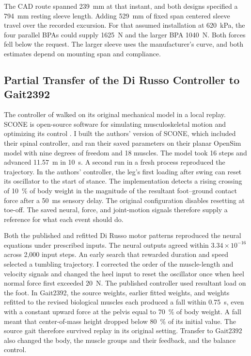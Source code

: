 The CAD route spanned \qty{239}{\milli\meter} at that instant, and both designs specified a \qty{794}{\milli\meter} resting sleeve length. Adding \qty{529}{\milli\meter} of fixed span centered sleeve travel over the recorded excursion. For that assumed installation at \qty{620}{\kPa}, the four parallel BPAs could supply \qty{1625}{\newton} and the larger BPA \qty{1040}{\newton}. Both forces fell below the request. The larger sleeve uses the manufacturer's curve, and both estimates depend on mounting span and compliance.

\subsection{Partial Transfer of the Di Russo Controller to Gait2392}\label{sec:app_dirusso_attempt}

The controller of \citet{dirusso_investigating_2023} walked on its original mechanical model in a local replay. SCONE is open-source software for simulating musculoskeletal motion and optimizing its control \citep{geijtenbeek_scone_2019}. I built the authors' version of SCONE, which included their spinal controller, and ran their saved parameters on their planar OpenSim model with nine degrees of freedom and 18 muscles. The model took 16 steps and advanced \qty{11.57}{\meter} in \qty{10}{\second}. A second run in a fresh process reproduced the trajectory. In the authors' controller, the leg's first loading after swing can reset its oscillator to the start of stance. The implementation detects a rising crossing of \qty{10}{\percent} of body weight in the magnitude of the resultant foot--ground contact force after a \qty{50}{\milli\second} sensory delay. The original configuration disables resetting at toe-off. The saved neural, force, and joint-motion signals therefore supply a reference for what each event should do.

Both the published and refitted Di Russo motor patterns reproduced the neural equations under prescribed inputs. The neural outputs agreed within $3.34\times10^{-16}$ across 2,000 input steps. An early search that rewarded duration and speed selected a tumbling trajectory. I corrected the order of the muscle-length and velocity signals and changed the heel input to reset the oscillator once when heel normal force first exceeded \qty{20}{\newton}. The published controller used resultant load on the foot. In Gait2392, the source weights, earlier fitted weights, and weights refitted to the revised biological muscles each produced a fall within \qty{0.75}{\second}, even with a constant upward force at the pelvis equal to \qty{70}{\percent} of body weight. A fall meant that center-of-mass height dropped below \qty{80}{\percent} of its initial value. The source gait therefore survived replay in its original setting. Transfer to Gait2392 also changed the body, the muscle groups and their feedback, and the balance control.

